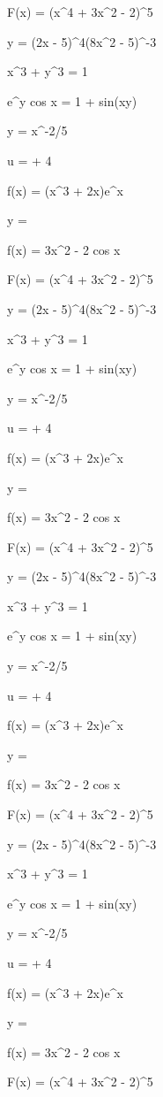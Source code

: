 \documentclass[11pt,a4paper]{article}
\begin{document}
 F(x) = (x^4 + 3x^2 - 2)^5

 y = (2x - 5)^4(8x^2 - 5)^{-3}

 x^3 + y^3 = 1

 e^y cos x = 1 + sin(xy)

y = x^{-2/5}

u =  + 4

f(x) = (x^3 + 2x)e^x

y = 

f(x) = 3x^2 - 2 cos x


 F(x) = (x^4 + 3x^2 - 2)^5

 y = (2x - 5)^4(8x^2 - 5)^{-3}

 x^3 + y^3 = 1

 e^y cos x = 1 + sin(xy)

y = x^{-2/5}

u =  + 4

f(x) = (x^3 + 2x)e^x

y = 

f(x) = 3x^2 - 2 cos x


 F(x) = (x^4 + 3x^2 - 2)^5

 y = (2x - 5)^4(8x^2 - 5)^{-3}

 x^3 + y^3 = 1

 e^y cos x = 1 + sin(xy)

y = x^{-2/5}

u =  + 4

f(x) = (x^3 + 2x)e^x

y = 

f(x) = 3x^2 - 2 cos x


 F(x) = (x^4 + 3x^2 - 2)^5

 y = (2x - 5)^4(8x^2 - 5)^{-3}

 x^3 + y^3 = 1

 e^y cos x = 1 + sin(xy)

y = x^{-2/5}

u =  + 4

f(x) = (x^3 + 2x)e^x

y = 

f(x) = 3x^2 - 2 cos x


 F(x) = (x^4 + 3x^2 - 2)^5
\end{document}
